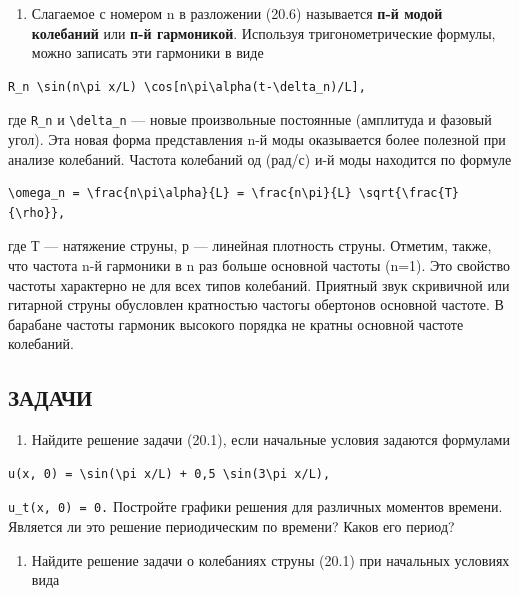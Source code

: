 \documentclass[
  ukrainian,
]{article}
\providecommand{\tightlist}{%
  \setlength{\itemsep}{0pt}\setlength{\parskip}{0pt}}
\begin{document}
\begin{enumerate}
\def\labelenumi{\arabic{enumi}.}
\setcounter{enumi}{1}
\tightlist
\item
  Слагаемое с номером n в разложении (20.6) называется \textbf{п-й модой
  колебаний} или \textbf{п-й гармоникой}. Используя тригонометрические
  формулы, можно записать эти гармоники в виде
\end{enumerate}

\begin{verbatim}
R_n \sin(n\pi x/L) \cos[n\pi\alpha(t-\delta_n)/L],
\end{verbatim}

где \texttt{R\_n} и \texttt{\textbackslash{}delta\_n} --- новые
произвольные постоянные (амплитуда и фазовый угол). Эта новая форма
представления n-й моды оказывается более полезной при анализе колебаний.
Частота колебаний од (рад/с) и-й моды находится по формуле

\begin{verbatim}
\omega_n = \frac{n\pi\alpha}{L} = \frac{n\pi}{L} \sqrt{\frac{T}{\rho}},
\end{verbatim}

где Т --- натяжение струны, р --- линейная плотность струны. Отметим,
также, что частота n-й гармоники в n раз больше основной частоты (n=1).
Это свойство частоты характерно не для всех типов колебаний. Приятный
звук скривичной или гитарной струны обусловлен кратностью частогы
обертонов основной частоте. В барабане частоты гармоник высокого порядка
не кратны основной частоте колебаний.

\subsection{ЗАДАЧИ}\label{ux437ux430ux434ux430ux447ux438-2}

\begin{enumerate}
\def\labelenumi{\arabic{enumi}.}
\tightlist
\item
  Найдите решение задачи (20.1), если начальные условия задаются
  формулами
\end{enumerate}

\begin{verbatim}
u(x, 0) = \sin(\pi x/L) + 0,5 \sin(3\pi x/L),
\end{verbatim}

\texttt{u\_t(x,\ 0)\ =\ 0.} Постройте графики решения для различных
моментов времени. Является ли это решение периодическим по времени?
Каков его период?

\begin{enumerate}
\def\labelenumi{\arabic{enumi}.}
\setcounter{enumi}{1}
\tightlist
\item
  Найдите решение задачи о колебаниях струны (20.1) при начальных
  условиях вида
\end{enumerate}
\end{document}
